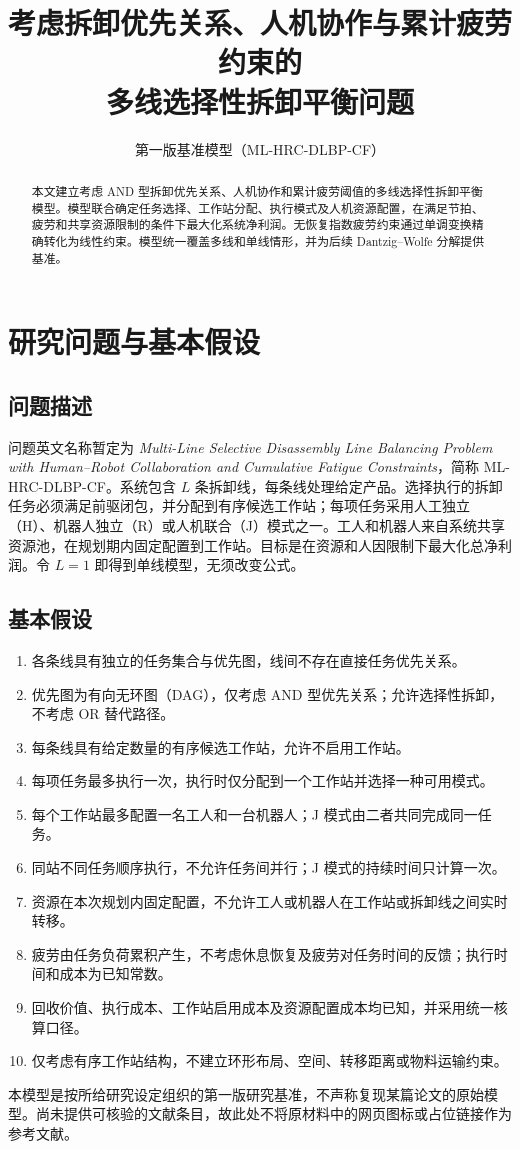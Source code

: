 \documentclass[UTF8,a4paper,11pt]{ctexart}
\title{考虑拆卸优先关系、人机协作与累计疲劳约束的\\多线选择性拆卸平衡问题}
\author{第一版基准模型（ML-HRC-DLBP-CF）}
\date{}
\begin{document}
\maketitle
\begin{abstract}
本文建立考虑 AND 型拆卸优先关系、人机协作和累计疲劳阈值的多线选择性拆卸平衡模型。模型联合确定任务选择、工作站分配、执行模式及人机资源配置，在满足节拍、疲劳和共享资源限制的条件下最大化系统净利润。无恢复指数疲劳约束通过单调变换精确转化为线性约束。模型统一覆盖多线和单线情形，并为后续 Dantzig--Wolfe 分解提供基准。
\end{abstract}

\section{研究问题与基本假设}
\subsection{问题描述}
问题英文名称暂定为 \emph{Multi-Line Selective Disassembly Line Balancing Problem with Human--Robot Collaboration and Cumulative Fatigue Constraints}，简称 ML-HRC-DLBP-CF。系统包含 $L$ 条拆卸线，每条线处理给定产品。选择执行的拆卸任务必须满足前驱闭包，并分配到有序候选工作站；每项任务采用人工独立（H）、机器人独立（R）或人机联合（J）模式之一。工人和机器人来自系统共享资源池，在规划期内固定配置到工作站。目标是在资源和人因限制下最大化总净利润。令 $L=1$ 即得到单线模型，无须改变公式。

\subsection{基本假设}
\begin{enumerate}
\item 各条线具有独立的任务集合与优先图，线间不存在直接任务优先关系。
\item 优先图为有向无环图（DAG），仅考虑 AND 型优先关系；允许选择性拆卸，不考虑 OR 替代路径。
\item 每条线具有给定数量的有序候选工作站，允许不启用工作站。
\item 每项任务最多执行一次，执行时仅分配到一个工作站并选择一种可用模式。
\item 每个工作站最多配置一名工人和一台机器人；J 模式由二者共同完成同一任务。
\item 同站不同任务顺序执行，不允许任务间并行；J 模式的持续时间只计算一次。
\item 资源在本次规划内固定配置，不允许工人或机器人在工作站或拆卸线之间实时转移。
\item 疲劳由任务负荷累积产生，不考虑休息恢复及疲劳对任务时间的反馈；执行时间和成本为已知常数。
\item 回收价值、执行成本、工作站启用成本及资源配置成本均已知，并采用统一核算口径。
\item 仅考虑有序工作站结构，不建立环形布局、空间、转移距离或物料运输约束。
\end{enumerate}
本模型是按所给研究设定组织的第一版研究基准，不声称复现某篇论文的原始模型。尚未提供可核验的文献条目，故此处不将原材料中的网页图标或占位链接作为参考文献。
\end{document}
